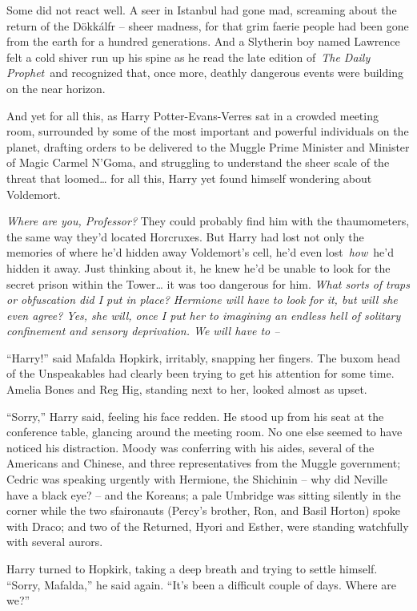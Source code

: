 Some did not react well. A seer in Istanbul had gone mad, screaming
about the return of the Dökkálfr -- sheer madness, for that grim faerie
people had been gone from the earth for a hundred generations. And a
Slytherin boy named Lawrence felt a cold shiver run up his spine as he
read the late edition of~\emph{The Daily Prophet}~and recognized that,
once more, deathly dangerous events were building on the near horizon.

And yet for all this, as Harry Potter-Evans-Verres sat in a crowded
meeting room, surrounded by some of the most important and powerful
individuals on the planet, drafting orders to be delivered to the Muggle
Prime Minister and Minister of Magic Carmel N'Goma, and struggling to
understand the sheer scale of the threat that loomed\ldots{} for all
this, Harry yet found himself wondering about Voldemort.

\emph{Where are you, Professor?} They could probably find him with the
thaumometers, the same way they'd located Horcruxes. But Harry had lost
not only the memories of where he'd hidden away Voldemort's cell, he'd
even lost~\emph{how}~he'd hidden it away. Just thinking about it, he
knew he'd be unable to look for the secret prison within the
Tower\ldots{} it was too dangerous for him. \emph{What sorts of traps or
obfuscation did I put in place? Hermione will have to look for it, but
will she even agree? Yes, she will, once I put her to imagining an
endless hell of solitary confinement and sensory deprivation. We will
have to --}

``Harry!'' said Mafalda Hopkirk, irritably, snapping her fingers. The
buxom head of the Unspeakables had clearly been trying to get his
attention for some time. Amelia Bones and Reg Hig, standing next to her,
looked almost as upset.

``Sorry,'' Harry said, feeling his face redden. He stood up from his
seat at the conference table, glancing around the meeting room. No one
else seemed to have noticed his distraction. Moody was conferring with
his aides, several of the Americans and Chinese, and three
representatives from the Muggle government; Cedric was speaking urgently
with Hermione, the Shichinin -- why did Neville have a black eye? -- and
the Koreans; a pale Umbridge was sitting silently in the corner while
the two sfaironauts (Percy's brother, Ron, and Basil Horton) spoke with
Draco; and two of the Returned, Hyori and Esther, were standing
watchfully with several aurors.

Harry turned to Hopkirk, taking a deep breath and trying to settle
himself. ``Sorry, Mafalda,'' he said again. ``It's been a difficult
couple of days. Where are we?''

